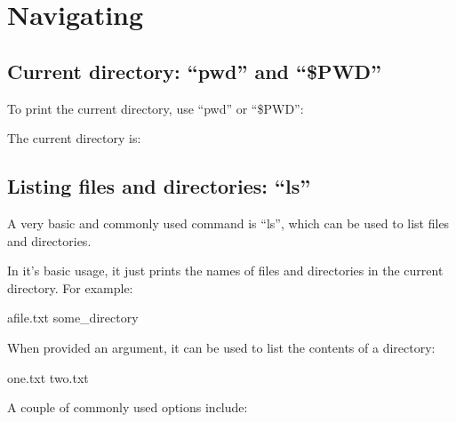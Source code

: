 \chapter{Navigating}

\section{Current directory: ``pwd'' and ``\$PWD''}

To print the current directory, use ``pwd'' or ``\$PWD'':
\begin{prompt}
The current directory is: %
\end{prompt}

\section{Listing files and directories: ``ls''}

A very basic and commonly used command is ``ls'', which can be used to list files and directories.

In it's basic usage, it just prints the names of files and directories in the current directory. For example:

\begin{prompt}
afile.txt   some_directory
\end{prompt}

When provided an argument, it can be used to list the contents of a directory:

\begin{prompt}
one.txt  two.txt
\end{prompt}

A couple of commonly used options include:

